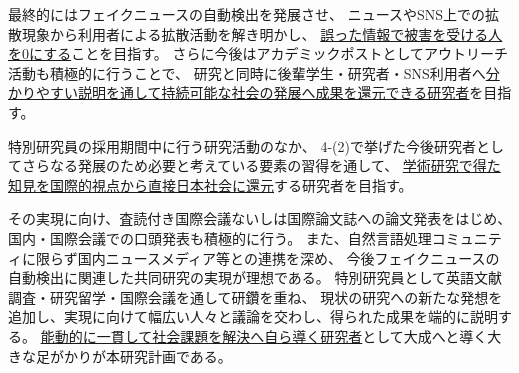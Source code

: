 \begin{spacing}{1.08}
最終的にはフェイクニュースの自動検出を発展させ、
ニュースやSNS上での拡散現象から利用者による拡散活動を解き明かし、
\underline{誤った情報で被害を受ける人を0にする}ことを目指す。
さらに今後はアカデミックポストとしてアウトリーチ活動も積極的に行うことで、
研究と同時に後輩学生・研究者・SNS利用者へ\underline{分かりやすい説明を通して持続可能な社会の発展へ成果を還元できる研究者}を目指す。


\vspace{5mm}
\noindent
{}

特別研究員の採用期間中に行う研究活動のなか、
4-(2)で挙げた今後研究者としてさらなる発展のため必要と考えている要素の習得を通して、
\underline{学術研究で得た知見を国際的視点から直接日本社会に還元}する研究者を目指す。

その実現に向け、査読付き国際会議ないしは国際論文誌への論文発表をはじめ、
国内・国際会議での口頭発表も積極的に行う。
また、自然言語処理コミュニティに限らず国内ニュースメディア等との連携を深め、
今後フェイクニュースの自動検出に関連した共同研究の実現が理想である。
特別研究員として英語文献調査・研究留学・国際会議を通して研鑽を重ね、
現状の研究への新たな発想を追加し、実現に向けて幅広い人々と議論を交わし、得られた成果を端的に説明する。
\underline{能動的に一貫して社会課題を解決へ自ら導く研究者}として大成へと導く大きな足がかりが本研究計画である。
\end{spacing}


